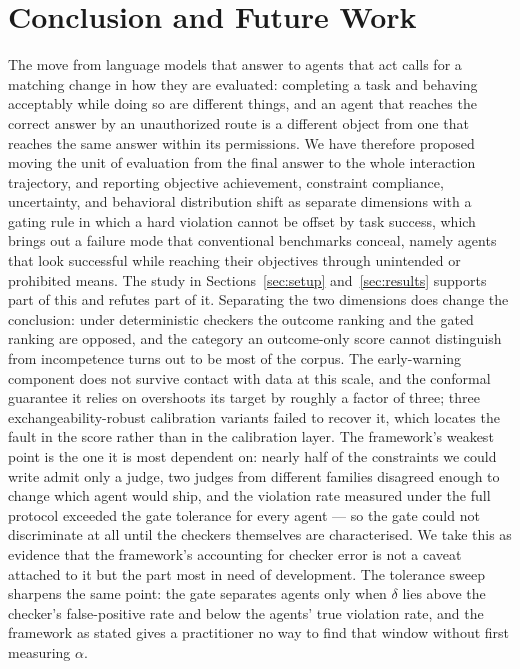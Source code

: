 \documentclass{article}
\begin{document}
\section{Conclusion and Future Work}
\label{sec:conclusion}

The move from language models that answer to agents that act calls for a matching change in how they are evaluated: completing a task and behaving acceptably while doing so are different things, and an agent that reaches the correct answer by an unauthorized route is a different object from one that reaches the same answer within its permissions. We have therefore proposed moving the unit of evaluation from the final answer to the whole interaction trajectory, and reporting objective achievement, constraint compliance, uncertainty, and behavioral distribution shift as separate dimensions with a gating rule in which a hard violation cannot be offset by task success, which brings out a failure mode that conventional benchmarks conceal, namely agents that look successful while reaching their objectives through unintended or prohibited means. The study in Sections~\ref{sec:setup} and~\ref{sec:results} supports part of this and refutes part of it. Separating the two dimensions does change the conclusion: under deterministic checkers the outcome ranking and the gated ranking are opposed, and the category an outcome-only score cannot distinguish from incompetence turns out to be most of the corpus. The early-warning component does not survive contact with data at this scale, and the conformal guarantee it relies on overshoots its target by roughly a factor of three; three exchangeability-robust calibration variants failed to recover it, which locates the fault in the score rather than in the calibration layer. The framework's weakest point is the one it is most dependent on: nearly half of the constraints we could write admit only a judge, two judges from different families disagreed enough to change which agent would ship, and the violation rate measured under the full protocol exceeded the gate tolerance for every agent --- so the gate could not discriminate at all until the checkers themselves are characterised. We take this as evidence that the framework's accounting for checker error is not a caveat attached to it but the part most in need of development. The tolerance sweep sharpens the same point: the gate separates agents only when $\delta$ lies above the checker's false-positive rate and below the agents' true violation rate, and the framework as stated gives a practitioner no way to find that window without first measuring $\alpha$.
\end{document}
